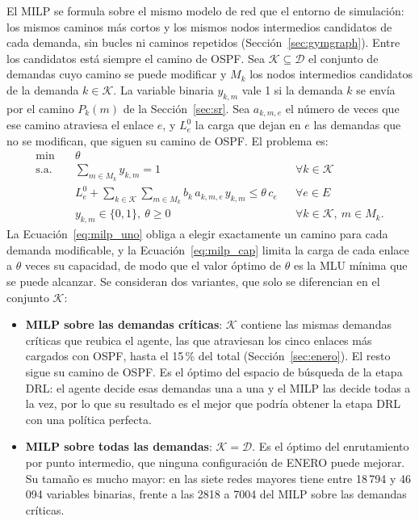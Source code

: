 El MILP se formula sobre el mismo modelo de red que el entorno de simulación: los mismos caminos más cortos y los mismos nodos intermedios candidatos de cada demanda, sin bucles ni caminos repetidos (Sección~\ref{sec:gymgraph}). Entre los candidatos está siempre el camino de OSPF. Sea $\mathcal{K} \subseteq \mathcal{D}$ el conjunto de demandas cuyo camino se puede modificar y $M_k$ los nodos intermedios candidatos de la demanda $k \in \mathcal{K}$. La variable binaria $y_{k,m}$ vale 1 si la demanda $k$ se envía por el camino $P_k(m)$ de la Sección~\ref{sec:sr}. Sea $a_{k,m,e}$ el número de veces que ese camino atraviesa el enlace $e$, y $L^{0}_{e}$ la carga que dejan en $e$ las demandas que no se modifican, que siguen su camino de OSPF. El problema es:
\begin{align}
	\min \quad & \theta \label{eq:milp_obj}\\
	\text{s.a.} \quad & \sum_{m \in M_k} y_{k,m} = 1 && \forall k \in \mathcal{K} \label{eq:milp_uno}\\
	& L^{0}_{e} + \sum_{k \in \mathcal{K}} \sum_{m \in M_k} b_k\, a_{k,m,e}\, y_{k,m} \leq \theta\, c_e && \forall e \in E \label{eq:milp_cap}\\
	& y_{k,m} \in \{0,1\},\ \theta \geq 0 && \forall k \in \mathcal{K},\ m \in M_k. \nonumber
\end{align}
La Ecuación~\eqref{eq:milp_uno} obliga a elegir exactamente un camino para cada demanda modificable, y la Ecuación~\eqref{eq:milp_cap} limita la carga de cada enlace a $\theta$ veces su capacidad, de modo que el valor óptimo de $\theta$ es la MLU mínima que se puede alcanzar. Se consideran dos variantes, que solo se diferencian en el conjunto $\mathcal{K}$:
\begin{itemize}
	\item \textbf{MILP sobre las demandas críticas}: $\mathcal{K}$ contiene las mismas demandas críticas que reubica el agente, las que atraviesan los cinco enlaces más cargados con OSPF, hasta el 15\,\% del total (Sección~\ref{sec:enero}). El resto sigue su camino de OSPF. Es el óptimo del espacio de búsqueda de la etapa DRL: el agente decide esas demandas una a una y el MILP las decide todas a la vez, por lo que su resultado es el mejor que podría obtener la etapa DRL con una política perfecta.
	\item \textbf{MILP sobre todas las demandas}: $\mathcal{K} = \mathcal{D}$. Es el óptimo del enrutamiento por punto intermedio, que ninguna configuración de ENERO puede mejorar. Su tamaño es mucho mayor: en las siete redes mayores tiene entre 18\,794 y 46\,094 variables binarias, frente a las 2818 a 7004 del MILP sobre las demandas críticas.
\end{itemize}


